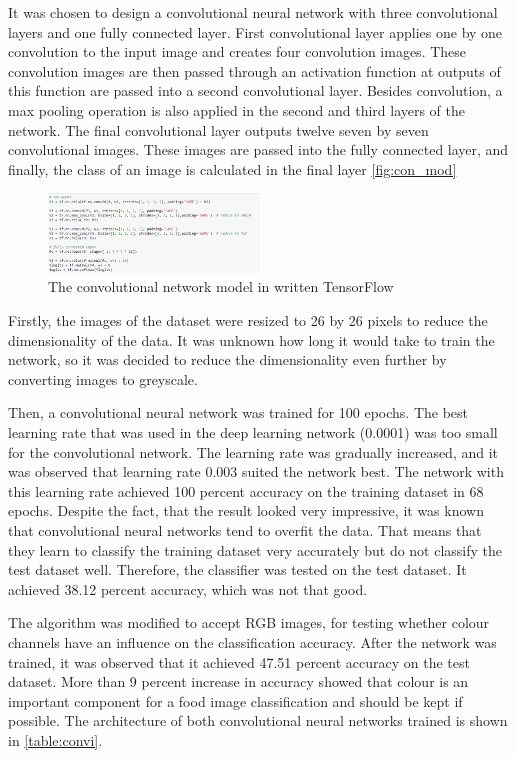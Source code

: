 It was chosen to design a convolutional neural network with three convolutional layers and one fully connected layer. First convolutional layer applies one by one convolution to the input image and creates four convolution images. These convolution images are then passed through an activation function at outputs of this function are passed into a second convolutional layer. Besides convolution, a max pooling operation is also applied in the second and third layers of the network. The final convolutional layer outputs twelve seven by seven convolutional images. These images are passed into the fully connected layer, and finally, the class of an image is calculated in the final layer \autoref{fig:con_mod}



\begin{figure}[h]
\centering
\includegraphics[width=0.5\textwidth]{Figures/4/conv.PNG}
\caption{The convolutional network model in written TensorFlow}
\label{fig:con_mod}
\end{figure}

Firstly, the images of the dataset were resized to 26 by 26 pixels to reduce the dimensionality of the data.
It was unknown how long it would take to train the network, so it was decided to reduce the dimensionality even further by converting images to greyscale.

Then, a convolutional neural network was trained for 100 epochs. The best learning rate that was used in the deep learning network (0.0001) was too small for the convolutional network. The learning rate was gradually increased, and it was observed that learning rate 0.003 suited the network best. The network with this learning rate achieved 100 percent accuracy on the training dataset in 68 epochs. Despite the fact, that the result looked very impressive, it was known that convolutional neural networks tend to overfit the data. That means that they learn to classify the training dataset very accurately but do not classify the test dataset well. Therefore, the classifier was tested on the test dataset. It achieved 38.12 percent accuracy, which was not that good.

The algorithm was modified to accept RGB images, for testing whether colour channels have an influence on the classification accuracy. After the network was trained, it was observed that it achieved 47.51 percent accuracy on the test dataset. More than 9 percent increase in accuracy showed that colour is an important component for a food image classification and should be kept if possible. The architecture of both convolutional neural networks trained is shown in \autoref{table:convi}.

